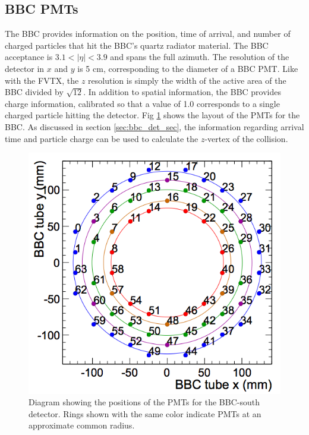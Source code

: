 \subsection{BBC PMTs}
The BBC provides information on the position, time of arrival, and number of charged particles that hit the BBC's quartz radiator material. The BBC acceptance is $3.1 < |\eta| < 3.9$ and spans the full azimuth. The resolution of the detector in $x$ and $y$ is 5 cm, corresponding to the diameter of a BBC PMT. Like with the FVTX, the $z$ resolution is simply the width of the active area of the BBC divided by $\sqrt{12}$. In addition to spatial information, the BBC provides charge information, calibrated so that a value of 1.0 corresponds to a single charged particle hitting the detector. Fig \ref{fig:bbc_rings} shows the layout of the PMTs for the BBC. As discussed in section \ref{sec:bbc_det_sec}, the information regarding arrival time and particle charge can be used to calculate the $z$-vertex of the collision. 
\begin{figure}[h!]
\begin{center}
\includegraphics[width=0.55\linewidth]{figs/bbc_rings.png}
\caption{Diagram showing the positions of the PMTs for the BBC-south detector. Rings shown with the same color indicate PMTs at an approximate common radius.}
\label{fig:bbc_rings}
\end{center}
\end{figure}




